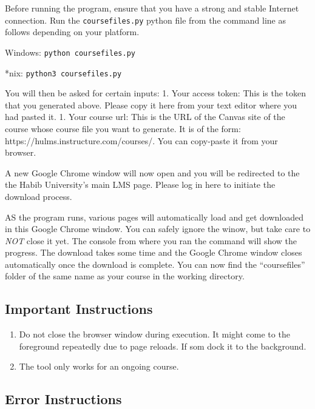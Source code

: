 \documentclass[
]{article}
\providecommand{\tightlist}{%
  \setlength{\itemsep}{0pt}\setlength{\parskip}{0pt}}
\begin{document}
Before running the program, ensure that you have a strong and stable
Internet connection. Run the \texttt{coursefiles.py} python file from
the command line as follows depending on your platform.

Windows: \texttt{python\ coursefiles.py}

*nix: \texttt{python3\ coursefiles.py}

You will then be asked for certain inputs: 1. Your access token: This is
the token that you generated above. Please copy it here from your text
editor where you had pasted it. 1. Your course url: This is the URL of
the Canvas site of the course whose course file you want to generate. It
is of the form: https://hulms.instructure.com/courses/. You can
copy-paste it from your browser.

A new Google Chrome window will now open and you will be redirected to
the the Habib University's main LMS page. Please log in here to initiate
the download process.

AS the program runs, various pages will automatically load and get
downloaded in this Google Chrome window. You can safely ignore the
winow, but take care to \emph{NOT} close it yet. The console from where
you ran the command will show the progress. The download takes some time
and the Google Chrome window closes automatically once the download is
complete. You can now find the ``coursefiles'' folder of the same name
as your course in the working directory.

\hypertarget{important-instructions}{%
\subsection{Important Instructions}\label{important-instructions}}

\begin{enumerate}
\def\labelenumi{\arabic{enumi}.}
\tightlist
\item
  Do not close the browser window during execution. It might come to the
  foreground repeatedly due to page reloads. If som dock it to the
  background.
\item
  The tool only works for an ongoing course.
\end{enumerate}

\hypertarget{error-instructions}{%
\subsection{Error Instructions}\label{error-instructions}}
\end{document}
